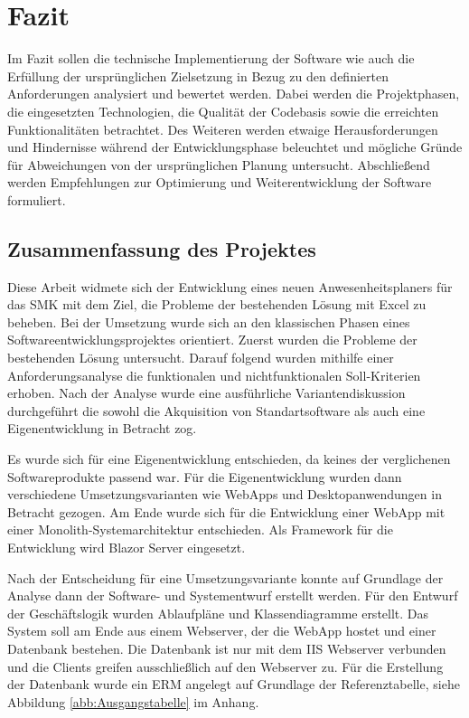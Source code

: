 \section{Fazit}
\label{sec:Fazit}
Im Fazit sollen die technische Implementierung der Software wie auch die Erfüllung der ursprünglichen Zielsetzung in Bezug zu den definierten Anforderungen analysiert und bewertet werden. Dabei werden die Projektphasen, die eingesetzten Technologien, die Qualität der Codebasis sowie die erreichten Funktionalitäten betrachtet. Des Weiteren werden etwaige Herausforderungen und Hindernisse während der Entwicklungsphase beleuchtet und mögliche Gründe für Abweichungen von der ursprünglichen Planung untersucht. Abschließend werden Empfehlungen zur Optimierung und Weiterentwicklung der Software formuliert.

\subsection{Zusammenfassung des Projektes}
\label{sec:Zusammenfassung}
Diese Arbeit widmete sich der Entwicklung eines neuen Anwesenheitsplaners für das SMK mit dem Ziel, die Probleme der bestehenden Lösung mit Excel zu beheben. Bei der Umsetzung wurde sich an den klassischen Phasen eines Softwareentwicklungsprojektes orientiert. Zuerst wurden die Probleme der bestehenden Lösung untersucht. Darauf folgend wurden mithilfe einer Anforderungsanalyse die funktionalen und nichtfunktionalen Soll-Kriterien erhoben. Nach der Analyse wurde eine ausführliche Variantendiskussion durchgeführt die sowohl die Akquisition von Standartsoftware als auch eine Eigenentwicklung in Betracht zog.

Es wurde sich für eine Eigenentwicklung entschieden, da keines der verglichenen Softwareprodukte passend war. Für die Eigenentwicklung wurden dann verschiedene Umsetzungsvarianten wie WebApps und Desktopanwendungen in Betracht gezogen. Am Ende wurde sich für die Entwicklung einer WebApp mit einer Monolith-Systemarchitektur entschieden. Als Framework für die Entwicklung wird Blazor Server eingesetzt.

Nach der Entscheidung für eine Umsetzungsvariante konnte auf Grundlage der Analyse dann der Software- und Systementwurf erstellt werden. Für den Entwurf der Geschäftslogik wurden Ablaufpläne und Klassendiagramme erstellt. Das System soll am Ende aus einem Webserver, der die WebApp hostet und einer Datenbank bestehen. Die Datenbank ist nur mit dem IIS Webserver verbunden und die Clients greifen ausschließlich auf den Webserver zu. Für die Erstellung der Datenbank wurde ein ERM angelegt auf Grundlage der Referenztabelle, siehe Abbildung \ref{abb:Ausgangstabelle} im Anhang.

